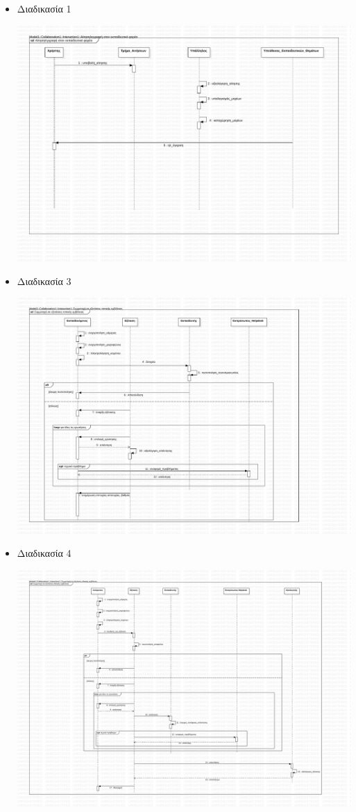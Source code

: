 \documentclass[a4paper, titlepage, twoside]{article}
\begin{document}
\begin{itemize}
\item Διαδικασία 1
\label{sec:org95b3fb4}
\begin{center}
\includegraphics[width=.9\linewidth]{seq_1.pdf}
\end{center}
\item Διαδικασία 3
\label{sec:org3c300ea}
\begin{center}
\includegraphics[width=.9\linewidth]{seq_3.pdf}
\end{center}
\item Διαδικασία 4
\label{sec:org0f8cf4e}
\begin{center}
\includegraphics[width=.9\linewidth]{seq_4.pdf}
\end{center}
\end{itemize}
\end{document}
